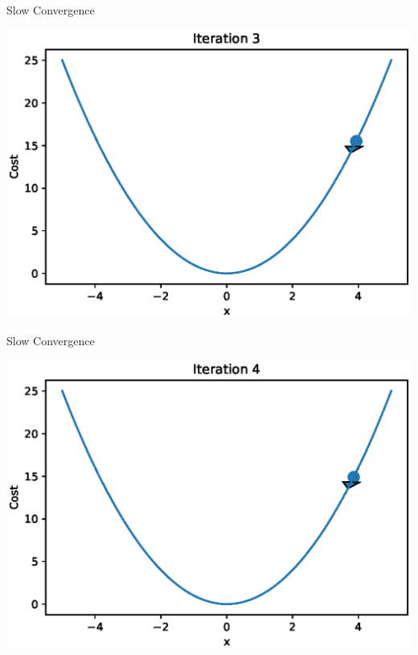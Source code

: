 \documentclass{beamer}
\begin{document}
\begin{frame}{Slow Convergence}
  \begin{center}
       \includegraphics[totalheight=6cm]{gradient-descent/undershooting-3.eps}
   \end{center}
\end{frame}

\begin{frame}{Slow Convergence}
  \begin{center}
       \includegraphics[totalheight=6cm]{gradient-descent/undershooting-4.eps}
   \end{center}
\end{frame}
\end{document}
